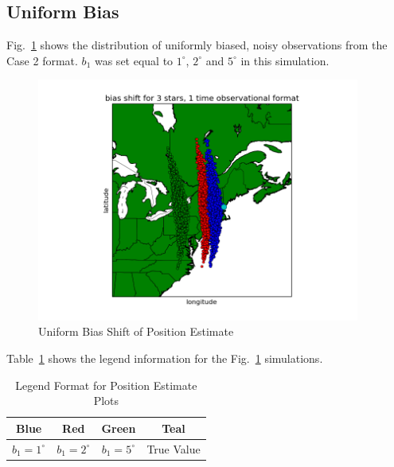 \documentclass[12pt,a4paper]{book}
\begin{document}
\subsection*{Uniform Bias}
Fig.~\ref{f:biasShift} shows the distribution of uniformly biased, noisy observations from the Case 2 format. $b_{1}$ was set equal to $1^{\circ}$, $2^{\circ}$ and $5^{\circ}$ in this simulation.
\FloatBarrier
\begin{figure}[!htb]
\centering
\includegraphics[height=8cm]{biasShift.png}
\caption{Uniform Bias Shift of Position Estimate}
\label{f:biasShift}
\end{figure}
\FloatBarrier Table~\ref{t:colorz3} shows the legend information for the Fig.~\ref{f:biasShift} simulations.
\begin{table}[ht!]
\centering
\begin{tabular}{ |c|c|c|c| } 
 \hline
 Blue & Red & Green & Teal\\ 
 \hline
 $b_{1} = 1^{\circ}$ & $b_{1} = 2^{\circ}$ & $b_{1} = 5^{\circ}$  & True Value \\ 
 \hline
\end{tabular}
\caption{Legend Format for Position Estimate Plots}
\label{t:colorz3}
\end{table}
\end{document}
